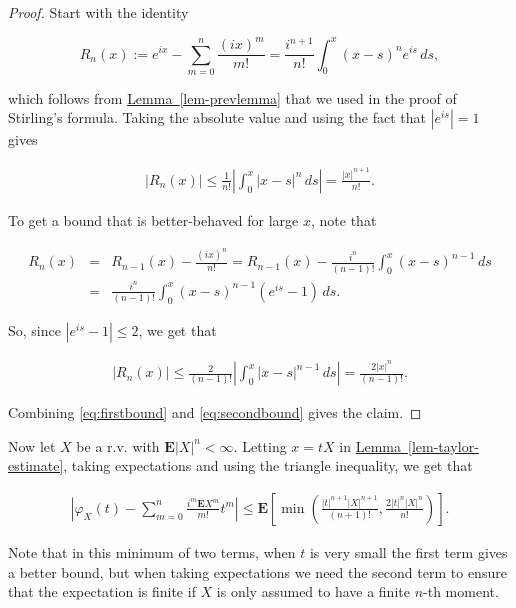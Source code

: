 \documentclass[11pt]{report}
\theoremstyle{plain}
\theoremstyle{definition}
\begin{document}
\begin{proof}
Start with the identity

\[
R_n(x) := e^{ix}-\sum_{m=0}^n \frac{(ix)^m}{m!} = \frac{i^{n+1}}{n!}\int_0^x(x-s)^n e^{is}\,ds,
\]

\noindent which follows from \hyperref[lem-prevlemma]{Lemma~\ref*{lem-prevlemma}} that we used
in the proof of Stirling's formula. Taking the
absolute value and using the fact that $|e^{is}|=1$
gives

\begin{align*}
\tag{14}\label{eq:firstbound}
|R_n(x)| \le \frac{1}{n!} \left|\int_0^x |x-s|^n\,ds\right| = \frac{|x|^{n+1}}{n!}.
\end{align*}

\noindent To get a bound that is better-behaved for large $x$,
note that

\begin{eqnarray*} R_n(x) &=& R_{n-1}(x) - \frac{(ix)^n}{n!} = R_{n-1}(x) - \frac{i^n}{(n-1)!}\int_0^x (x-s)^{n-1}\,ds \\
&=& \frac{i^n}{(n-1)!}\int_0^x (x-s)^{n-1}(e^{is}-1)\,ds.
\end{eqnarray*}

\noindent So, since $|e^{is}-1|\le 2$, we get that

\begin{align*}
\tag{15}\label{eq:secondbound}
|R_n(x)| \le \frac{2}{(n-1)!} \left|\int_0^x |x-s|^{n-1}\,ds\right| = \frac{2|x|^{n}}{(n-1)!}.
\end{align*}

\noindent Combining \eqref{eq:firstbound} and \eqref{eq:secondbound}
gives the claim.
\end{proof}

\noindent Now let $X$ be a r.v. with $\mathbf{E}|X|^n < \infty$.
Letting $x=tX$ in \hyperref[lem-taylor-estimate]{Lemma~\ref*{lem-taylor-estimate}}, taking
expectations and using the triangle inequality, we get
that

\begin{align*}
\tag{16}\label{eq:taylor-expec}
\left|\varphi_X(t)-\sum_{m=0}^n \frac{i^m \mathbf{E} X^m}{m!}t^m \right| \le \mathbf{E}\left[ \min\left(
\frac{|t|^{n+1} |X|^{n+1}}{(n+1)!}, \frac{2 |t|^n |X|^n}{n!} \right) \right].
\end{align*}

\noindent Note that in this minimum of two terms, when $t$ is
very small the first term gives a better bound, but
when taking expectations we need the second term to
ensure that the expectation is finite if $X$ is only
assumed to have a finite $n$-th moment.
\end{document}
